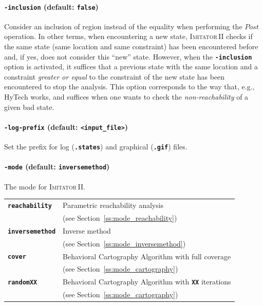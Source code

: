 \documentclass[a4paper,10pt]{article}
\newcommand{\hytech}{{\sc HyTech}}
\newcommand{\imitatordeux}{\textsc{Imitator}\,II}
\newcommand{\code}[1]{\textbf{\texttt{#1}}}
\begin{document}
\paragraph{\code{-inclusion} (default: \code{false})}
Consider an inclusion of region instead of the equality when performing the $\mathit{Post}$ operation.
In other terms, when encountering a new state, \imitatordeux{} checks if the same state (same location and same constraint) has been encountered before and, if yes, does not consider this ``new'' state.
However, when the \code{-inclusion} option is activated, it suffices that a previous state with the same location and a constraint \emph{greater or equal} to the constraint of the new state has been encountered to stop the analysis.
This option corresponds to the way that, e.g., \hytech{} works, and suffices when one wants to check the \emph{non-reachability} of a given bad state.


\paragraph{\code{-log-prefix} (default: \code{<input\_file>})}
Set the prefix for log (\code{.states}) and graphical (\code{.gif}) files.


\paragraph{\code{-mode} (default: \code{inversemethod})}
The mode for \imitatordeux{}.

\begin{tabular}{@{} l @{\ \ } l}
 \code{reachability} & Parametric reachability analysis  \\
 & (see Section~\ref{ss:mode_reachability}) \\
 \code{inversemethod} & Inverse method \\
 & (see Section~\ref{ss:mode_inversemethod}) \\
 \code{cover} & Behavioral Cartography Algorithm with full coverage \\
 & (see Section~\ref{ss:mode_cartography}) \\
 \code{randomXX} & Behavioral Cartography Algorithm with \code{XX} iterations \\
  & (see Section~\ref{ss:mode_cartography}) \\
\end{tabular}
\end{document}
